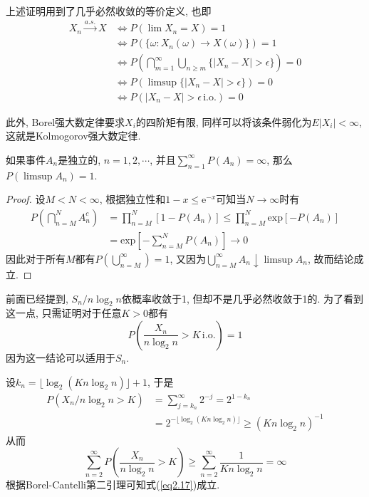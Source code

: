 \documentclass[cn, 12pt, math=mtpro2, bibstyle=apa, blue, twocol]{elegantbook}
\begin{document}
\begin{remark}
上述证明用到了几乎必然收敛的等价定义, 也即
\begin{align*}
X_n\xrightarrow{a.s.}X&\Leftrightarrow P(\lim X_n=X)=1 \\
&\Leftrightarrow P(\{\omega: X_n(\omega) \to X(\omega) \})=1 \\
&\Leftrightarrow \textstyle P(\bigcap_{m=1}^\infty\bigcup_{n\geq m} \{|X_n-X|>\epsilon\})=0 \\
&\Leftrightarrow P(\limsup \{|X_n-X|>\epsilon \})=0 \\
&\Leftrightarrow P(|X_n-X|>\epsilon\,\text{i.o.})=0
\end{align*}

此外, Borel强大数定律要求$X_i$的四阶矩有限, 同样可以将该条件弱化为$E|X_i|<\infty$, 这就是Kolmogorov强大数定律.
\end{remark}
\begin{theorem}
  如果事件$A_n$是独立的, $n=1,2,\cdots$, 并且$\sum_{n=1}^\infty P(A_n)=\infty$, 那么$P(\limsup A_n)=1$.
\end{theorem}
\begin{proof}
  设$M<N<\infty$, 根据独立性和$1-x\leq \text{e}^{-x}$可知当$N\to\infty$时有
  \begin{align*}
  P\left(\bigcap_{n=M}^NA_n^c\right)&=\prod_{n=M}^{N}[1-P(A_n)]\leq \prod_{n=M}^{N}\text{exp}[-P(A_n)] \\
  &=\text{exp}\left[-\sum_{n=M}^{N}P(A_n)\right]\to 0
  \end{align*}
  因此对于所有$M$都有$P(\bigcup_{n=M}^\infty)=1$, 又因为$\bigcup_{n=M}^\infty A_n\downarrow \limsup A_n$, 故而结论成立.
\end{proof}
\begin{example}[圣彼得堡悖论: 续]
前面已经提到, $S_n/n\log_2n$依概率收敛于1, 但却不是几乎必然收敛于1的. 为了看到这一点, 只需证明对于任意$K>0$都有
\begin{equation}\label{eq2.17}
  P\left(\frac{X_n}{n\log_2n}>K\,\text{i.o.}\right)=1
\end{equation}
因为这一结论可以适用于$S_n$.

设$k_n=\lfloor\log_2(Kn\log_2n)\rfloor+1$, 于是
\begin{align*}
P(X_n/n\log_2n>K)&=\sum_{j=k_n}^{\infty}2^{-j}=2^{1-k_n} \\
&=2^{-\lfloor\log_2(Kn\log_2n)\rfloor}\geq (Kn\log_2n)^{-1}
\end{align*}
从而
$$\sum_{n=2}^{\infty}P\left(\frac{X_n}{n\log_2n}>K\right)\geq \sum_{n=2}^{\infty}\frac{1}{Kn\log_2n}=\infty$$
根据Borel-Cantelli第二引理可知式(\ref{eq2.17})成立.
\end{example}
\end{document}
